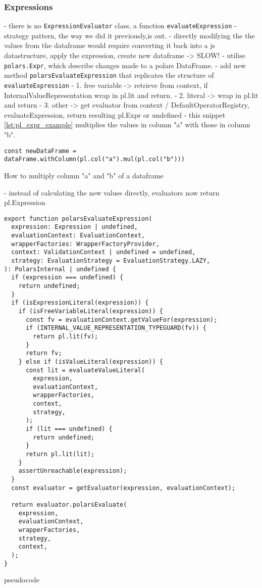 \subsubsection{Expressions}
- there is no \Verb|ExpressionEvaluator| class, a function \Verb|evaluateExpression|
- strategy pattern, the way we did it previously,is out.
- directly modifying the the values from the dataframe would require converting it back into a js datastructure, apply the expression, create new dataframe -> SLOW!
- utilise \Verb|polars.Expr|, which describe changes made to a polars DataFrame.
- add new method \Verb|polarsEvaluateExpression| that replicates the structure of \Verb|evaluateExpression|
- 1. free variable -> retrieve from context, if InternalValueRepresentation wrap in pl.lit and return.
- 2. literal -> wrap in pl.lit and return
- 3. other -> get evaluator from context / DefaultOperatorRegistry, evaluateExpression, return resulting pl.Expr or undefined
- this snippet \ref{lst:pl_expr_example} multiplies the values in column "a" with those in column "b".
\begin{listing}
	\begin{verbatim}
const newDataFrame = dataFrame.withColumn(pl.col("a").mul(pl.col("b")))
	\end{verbatim}
	\caption{How to multiply column "a" and "b" of a dataframe}
	\label{lst:pl_expr_example}
\end{listing}
- instead of calculating the new values directly, evaluators now return pl.Expression
\begin{listing}
	\begin{verbatim}
export function polarsEvaluateExpression(
  expression: Expression | undefined,
  evaluationContext: EvaluationContext,
  wrapperFactories: WrapperFactoryProvider,
  context: ValidationContext | undefined = undefined,
  strategy: EvaluationStrategy = EvaluationStrategy.LAZY,
): PolarsInternal | undefined {
  if (expression === undefined) {
    return undefined;
  }
  if (isExpressionLiteral(expression)) {
    if (isFreeVariableLiteral(expression)) {
      const fv = evaluationContext.getValueFor(expression);
      if (INTERNAL_VALUE_REPRESENTATION_TYPEGUARD(fv)) {
        return pl.lit(fv);
      }
      return fv;
    } else if (isValueLiteral(expression)) {
      const lit = evaluateValueLiteral(
        expression,
        evaluationContext,
        wrapperFactories,
        context,
        strategy,
      );
      if (lit === undefined) {
        return undefined;
      }
      return pl.lit(lit);
    }
    assertUnreachable(expression);
  }
  const evaluator = getEvaluator(expression, evaluationContext);

  return evaluator.polarsEvaluate(
    expression,
    evaluationContext,
    wrapperFactories,
    strategy,
    context,
  );
}
	\end{verbatim}
	\caption{pseudocode}
	\label{lst:pseudocode}
\end{listing}


